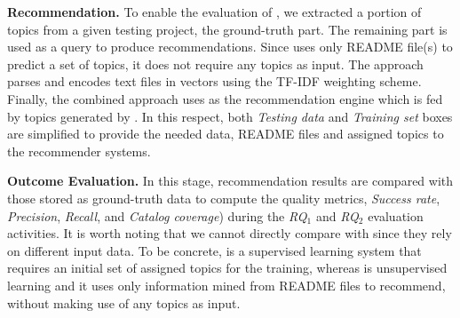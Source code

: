 \vspace{.1cm}
\noindent\textbf{Recommendation.} To enable the evaluation of \TF, we extracted a portion of topics from a given testing project, \ie the ground-truth part. The remaining part is used as a query to produce recommendations. %
Since \MNB uses only README file(s) to predict a set of topics, it does not require any topics as input. The approach parses and encodes text files in vectors using the TF-IDF weighting scheme. 
Finally, the combined approach uses \TF as the recommendation engine which is fed by topics generated by \MNB. In this respect, both \textit{Testing data} and \textit{Training set} boxes are simplified to provide the needed data, \ie README files and assigned topics to the recommender systems.

\vspace{.1cm}
\noindent\textbf{Outcome Evaluation.} In this stage, recommendation results are compared with those stored as ground-truth data to compute the quality metrics, \ie \textit{Success rate}, \textit{Precision}, \textit{Recall}, and \textit{Catalog coverage}) during the \textit{RQ$_1$} and \textit{RQ$_2$} evaluation activities.  
%
It is worth noting that we cannot directly compare \TF with \MNB since they rely on different input data. To be concrete, \TF is a supervised learning system that requires an initial set of assigned topics for the training, whereas \MNB is unsupervised learning and it uses only information mined from README files to recommend, without making use of any topics as input. 







